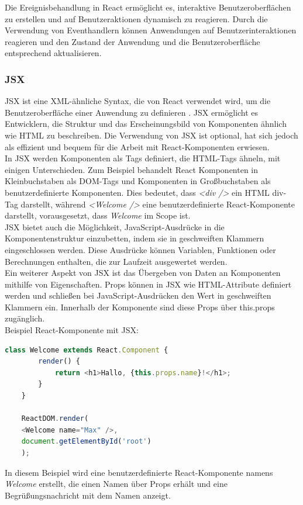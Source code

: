 Die Ereignisbehandlung in React ermöglicht es, interaktive Benutzeroberflächen zu erstellen und auf Benutzeraktionen dynamisch zu reagieren. Durch die Verwendung von Eventhandlern können Anwendungen auf Benutzerinteraktionen reagieren und den Zustand der Anwendung und die Benutzeroberfläche entsprechend aktualisieren.

\subsubsection{JSX}
JSX ist eine XML-ähnliche Syntax, die von React verwendet wird, um die Benutzeroberfläche einer Anwendung zu definieren \cite{deLegacyReactjs}. JSX ermöglicht es Entwicklern, die Struktur und das Erscheinungsbild von Komponenten ähnlich wie HTML zu beschreiben. Die Verwendung von JSX ist optional,  hat sich jedoch als effizient und bequem für die Arbeit mit React-Komponenten erwiesen.\\
In JSX werden Komponenten als Tags definiert, die HTML-Tags ähneln, mit einigen Unterschieden. Zum Beispiel behandelt React Komponenten in Kleinbuchstaben  als DOM-Tags und Komponenten in Großbuchstaben  als benutzerdefinierte Komponenten\cite{ReactComponentsAndProps}. Dies bedeutet, dass \emph{<div />} ein HTML div-Tag darstellt, während \emph{<Welcome />} eine benutzerdefinierte React-Komponente darstellt, vorausgesetzt, dass \emph{Welcome} im Scope ist.\\
JSX bietet auch die Möglichkeit, JavaScript-Ausdrücke in die Komponentenstruktur einzubetten, indem sie in geschweiften Klammern {} eingeschlossen werden. Diese Ausdrücke können Variablen, Funktionen oder Berechnungen enthalten, die zur Laufzeit ausgewertet werden.\\
Ein weiterer Aspekt von JSX ist das Übergeben von  Daten an Komponenten mithilfe von Eigenschaften. Props können in JSX  wie HTML-Attribute definiert werden und schließen bei JavaScript-Ausdrücken den Wert in geschweiften Klammern ein\cite{deLegacyReactjs}. Innerhalb der Komponente sind diese Props über this.props zugänglich.\\
Beispiel React-Komponente mit JSX: 

\begin{lstlisting}[language=JavaScript,
	frame=single,           % Ein Rahmen um den Code
	framexleftmargin=15pt,  % Rahmen link von den Zahlen
	style=algoBericht,
	label={JSX},
	captionpos=b ,          % Caption unter den Code setzen
	caption={Beispiel JSX }]
class Welcome extends React.Component {
        render() {
        	return <h1>Hallo, {this.props.name}!</h1>;
        }
    }

    ReactDOM.render(
    <Welcome name="Max" />,
    document.getElementById('root')
    );
\end{lstlisting}
In diesem Beispiel wird eine benutzerdefinierte React-Komponente namens \emph{Welcome} erstellt, die einen Namen über Props erhält und eine Begrüßungsnachricht mit dem Namen anzeigt.


